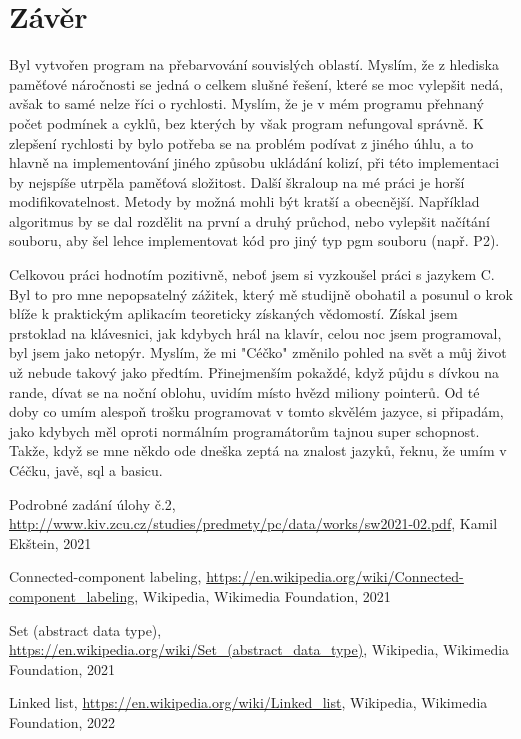 \documentclass[12pt, a4paper]{article}
\begin{document}
\newpage
\section{Závěr}
Byl vytvořen program na přebarvování souvislých oblastí. Myslím, že z hlediska paměťové náročnosti se jedná o celkem slušné řešení, které se moc vylepšit nedá, avšak to samé nelze říci o rychlosti. Myslím, že je v mém programu přehnaný počet podmínek a cyklů, bez kterých by však program nefungoval správně. K zlepšení rychlosti by bylo potřeba se na problém podívat z jiného úhlu, a to hlavně na implementování jiného způsobu ukládání kolizí, při této implementaci by nejspíše utrpěla paměťová složitost. Další škraloup na mé práci je horší modifikovatelnost. Metody by možná mohli být kratší a obecnější. Například algoritmus by se dal rozdělit na první a druhý průchod, nebo vylepšit načítání souboru, aby šel lehce implementovat kód pro jiný typ pgm souboru (např. P2).

Celkovou práci hodnotím pozitivně, neboť jsem si vyzkoušel práci s jazykem C. Byl to pro mne nepopsatelný zážitek, který mě studijně obohatil a posunul o krok blíže k praktickým aplikacím teoreticky získaných vědomostí. Získal jsem prstoklad na klávesnici, jak kdybych hrál na klavír, celou noc jsem programoval, byl jsem jako netopýr. Myslím, že mi "Céčko" změnilo pohled na svět a můj život už nebude takový jako předtím. Přinejmenším pokaždé, když půjdu s dívkou na rande, dívat se na noční oblohu, uvidím místo hvězd miliony pointerů. Od té doby co umím alespoň trošku programovat v tomto skvělém jazyce, si připadám, jako kdybych měl oproti normálním programátorům tajnou super schopnost. Takže, když se mne někdo ode dneška zeptá na znalost jazyků, řeknu, že umím v Céčku, javě, sql a basicu.

\begin{thebibliography}{9}

	Podrobné zadání úlohy č.2,
	\url {http://www.kiv.zcu.cz/studies/predmety/pc/data/works/sw2021-02.pdf},
	Kamil Ekštein,
	2021

	Connected-component labeling, 
	\url {https://en.wikipedia.org/wiki/Connected-component_labeling},
 	Wikipedia, 
	Wikimedia Foundation, 
	2021

	Set (abstract data type),
	\url {https://en.wikipedia.org/wiki/Set_(abstract_data_type)},
 	Wikipedia, 
	Wikimedia Foundation,
 	2021

	Linked list, 
	\url {https://en.wikipedia.org/wiki/Linked_list},
 	Wikipedia,
	Wikimedia Foundation, 
	2022

\end{thebibliography}
\end{document}
